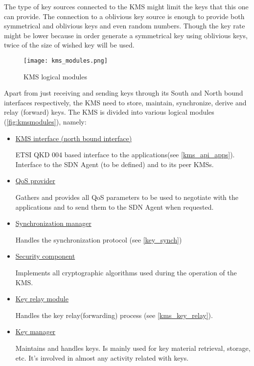 \begin{refsection}
The type of key sources connected to the \ac{KMS} might limit the keys that this one can provide. The connection to a oblivious key source is enough to provide both symmetrical and oblivious keys and even random numbers. Though the key rate might be lower because in order generate a symmetrical key using oblivious keys, twice of the size of wished key will be used.

\begin{figure}[H]
	\centering
	\texttt{[image: kms\_modules.png]}
	\caption{\ac{KMS} logical modules}
	\label{fig:kmsmodules}
\end{figure}

Apart from just receiving and sending keys through its South and North bound interfaces respectively, the \ac{KMS} need to store, maintain, synchronize, derive and relay (forward) keys. The \ac{KMS} is divided into various logical modules (\autoref{fig:kmsmodules}), namely:

\begin{itemize}
	\item{ \underline{KMS interface (north bound interface)}} 
	
	ETSI QKD 004 based interface to the applications(see \ref{kms_api_apps}). Interface to the \ac{SDN} Agent (to be defined) and to its peer \ac{KMS}s.
	
	\item{\underline{QoS provider}} 
	
	Gathers and provides all QoS parameters to be used to negotiate with the applications and to send them to the \ac{SDN} Agent when requested.
	
	\item{\underline{Synchronization manager}} 
	
	Handles the synchronization protocol (see \ref{key_synch})
	
	\item{\underline{Security component}} 
	
	Implements all cryptographic algorithms used during the operation of the \ac{KMS}.
	
	\item{\underline{Key relay module}} 
	
	Handles the key relay(forwarding) process (see \ref{kms_key_relay}).
	
	\item{\underline{Key manager}} 
	
	Maintains and handles keys. Is mainly used for key material retrieval, storage, etc. It's involved in almost any activity related with keys.
	

\end{itemize}
\end{refsection}
